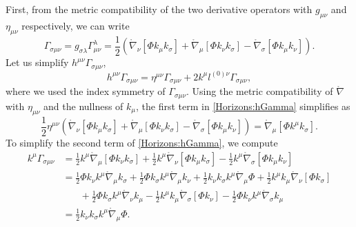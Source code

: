 First, from the metric compatibility of the two derivative operators with $g_{\mu \nu}$ and $\eta_{\mu \nu}$ respectively, we can write
\begin{equation}
    \Gamma_{\sigma \mu \nu} = g_{\sigma \lambda} \Gamma^\lambda_{\mu \nu} = \frac{1}{2}\left( \mathring{\nabla}_{\nu} \left[\Phi k_{\mu} k_{\sigma}\right] +
    \mathring{\nabla}_{\mu} \left[\Phi k_{\nu} k_{\sigma}\right] - \mathring{\nabla}_{\sigma}\left[\Phi k_{\mu} k_{\nu}\right]\right).
\end{equation}
Let us simplify $h^{\mu \nu}\Gamma_{\sigma \mu \nu}$,
\begin{equation} \label{Horizons:hGamma}
    h^{\mu \nu} \Gamma_{\sigma \mu \nu} = \eta^{\mu \nu} \Gamma_{\sigma \mu \nu} + 2 k^\mu l^{(0)\nu} \Gamma_{\sigma \mu \nu},
\end{equation}
where we used the index symmetry of $\Gamma_{\sigma \mu \nu}$. Using the metric compatibility of $\mathring{\nabla}$ with $\eta_{\mu \nu}$ and the nullness of $k_\mu$, the first term in \eqref{Horizons:hGamma} simplifies as
\begin{equation}
    \frac{1}{2} \eta^{\mu \nu}\left( \mathring{\nabla}_{\nu} \left[\Phi k_{\mu} k_{\sigma}\right] +
\mathring{\nabla}_{\mu} \left[\Phi k_{\nu} k_{\sigma}\right] - \mathring{\nabla}_{\sigma}\left[\Phi k_{\mu} k_{\nu}\right]\right) = \mathring{\nabla}_\mu \left[ \Phi k^\mu k_\sigma \right].
\end{equation}
To simplify the second term of \eqref{Horizons:hGamma}, we compute
\begin{equation}  
    \begin{split}
        k^{\mu} \Gamma_{\sigma \mu \nu} &= \frac{1}{2} k^{\mu} \mathring{\nabla}_{\mu} \left[\Phi k_{\nu} k_{\sigma}\right] + \frac{1}{2} k^{\mu}
        \mathring{\nabla}_{\nu} \left[\Phi k_{\mu} k_{\sigma}\right] - \frac{1}{2} k^{\mu} \mathring{\nabla}_{\sigma} \left[\Phi k_{\mu} k_{\nu}\right] 
        \\
                           &= \frac{1}{2} \Phi k_{\nu} k^{\mu} \mathring{\nabla}_{\mu}k_{\sigma} + \frac{1}{2} \Phi k_{\sigma} k^{\mu}
                           \mathring{\nabla}_{\mu} k_{\nu} + \frac{1}{2} k_{\nu} k_{\sigma} k^{\mu} \mathring{\nabla}_{\mu} \Phi + \frac{1}{2}
                           k^{\mu}k_{\mu} \mathring{\nabla}_{\nu}\left[\Phi k_{\sigma}\right] \\
                           &\phantom{=\ }\ + \frac{1}{2} \Phi k_{\sigma} k^{\mu}
                           \mathring{\nabla}_{\nu} k_{\mu} - \frac{1}{2} k^{\mu} k_{\mu} \mathring{\nabla}_{\sigma} \left[\Phi k_{\nu}\right] -
                           \frac{1}{2} \Phi k_{\nu} k^{\mu} \mathring{\nabla}_{\sigma} k_{\mu} \\
                           &= \frac{1}{2} k_{\nu} k_{\sigma} k^{\mu} \mathring{\nabla}_{\mu}\Phi.
    \end{split}
\end{equation}
